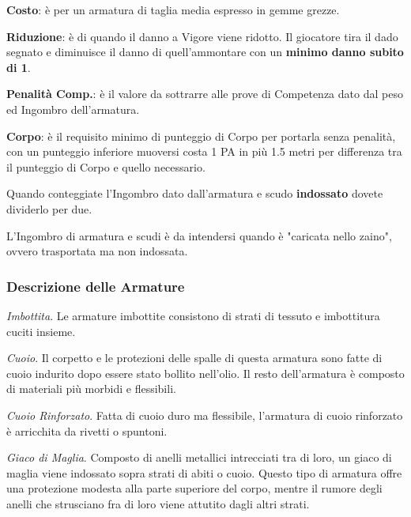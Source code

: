 \documentclass[12pt,a4paper,twoside,openany]{book}
\begin{document}
\begin{multicols}{2}

\textbf{Costo}: è per un armatura di taglia media espresso in gemme grezze.

\textbf{Riduzione}: è di quando il danno a Vigore viene ridotto. Il giocatore tira il dado segnato e diminuisce il danno di quell'ammontare con un \textbf{minimo danno subito di 1}.

\textbf{Penalità Comp.}: è il valore da sottrarre alle prove di Competenza dato dal peso ed Ingombro dell'armatura.

\textbf{Corpo}: è il requisito minimo di punteggio di Corpo per portarla senza penalità, con un punteggio inferiore muoversi costa 1 PA in più 1.5 metri per differenza tra il punteggio di Corpo e quello necessario.

\medskip

\begin{changemargin}{0.3cm}{0.3cm}\begin{narratore} Quando conteggiate l'Ingombro dato dall'armatura e scudo \textbf{indossato} dovete dividerlo per due.

L'Ingombro di armatura e scudi è da intendersi quando è "caricata nello zaino", ovvero trasportata ma non indossata.\end{narratore}\end{changemargin}

\subsubsection{Descrizione delle Armature}


\textit{Imbottita}. Le armature imbottite consistono di strati di tessuto e imbottitura cuciti insieme.

\textit{Cuoio}. Il corpetto e le protezioni delle spalle di questa armatura sono fatte di cuoio indurito dopo essere stato bollito nell'olio. Il resto dell'armatura è composto di
materiali più morbidi e flessibili.

\textit{Cuoio Rinforzato}. Fatta di cuoio duro ma flessibile, l'armatura di cuoio rinforzato è arricchita da rivetti o spuntoni.

\textit{Giaco di Maglia}. Composto di anelli metallici intrecciati tra di loro, un giaco di maglia viene indossato sopra strati di abiti o cuoio. Questo tipo di armatura offre una protezione modesta alla parte superiore del corpo, mentre il rumore degli anelli che strusciano fra di loro viene attutito dagli altri strati.


\end{multicols}
\end{document}
